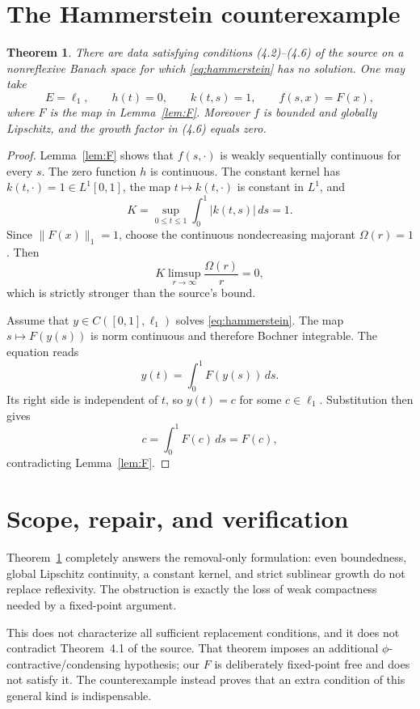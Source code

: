 \documentclass[11pt]{article}
\newtheorem{theorem}{Theorem}
\begin{document}
\section{The Hammerstein counterexample}

\begin{theorem}\label{thm:main}
There are data satisfying conditions (4.2)--(4.6) of the source on a
nonreflexive Banach space for which \eqref{eq:hammerstein} has no solution.
One may take
\[
 E=\ell_1,\qquad h(t)=0,\qquad k(t,s)=1,\qquad f(s,x)=F(x),
\]
where $F$ is the map in Lemma~\ref{lem:F}.  Moreover $f$ is bounded and
globally Lipschitz, and the growth factor in (4.6) equals zero.
\end{theorem}

\begin{proof}
Lemma~\ref{lem:F} shows that $f(s,\cdot)$ is weakly sequentially continuous
for every $s$.  The zero function $h$ is continuous.  The constant kernel has
$k(t,\cdot)=1\in L^1[0,1]$, the map $t\mapsto k(t,\cdot)$ is constant in
$L^1$, and
\[
 K=\sup_{0\leq t\leq1}\int_0^1|k(t,s)|\,ds=1.
\]
Since $\|F(x)\|_1=1$, choose the continuous nondecreasing majorant
$\Omega(r)=1$.  Then
\[
 K\limsup_{r\to\infty}\frac{\Omega(r)}r=0,
\]
which is strictly stronger than the source's bound.

Assume that $y\in C([0,1],\ell_1)$ solves \eqref{eq:hammerstein}.  The map
$s\mapsto F(y(s))$ is norm continuous and therefore Bochner integrable.  The
equation reads
\[
 y(t)=\int_0^1F(y(s))\,ds.
\]
Its right side is independent of $t$, so $y(t)=c$ for some $c\in\ell_1$.
Substitution then gives
\[
 c=\int_0^1F(c)\,ds=F(c),
\]
contradicting Lemma~\ref{lem:F}.
\end{proof}

\section{Scope, repair, and verification}

Theorem~\ref{thm:main} completely answers the removal-only formulation: even
boundedness, global Lipschitz continuity, a constant kernel, and strict
sublinear growth do not replace reflexivity.  The obstruction is exactly the
loss of weak compactness needed by a fixed-point argument.

This does not characterize all sufficient replacement conditions, and it does
not contradict Theorem~4.1 of the source.  That theorem imposes an additional
$\phi$-contractive/condensing hypothesis; our $F$ is deliberately fixed-point
free and does not satisfy it.  The counterexample instead proves that an extra
condition of this general kind is indispensable.
\end{document}
